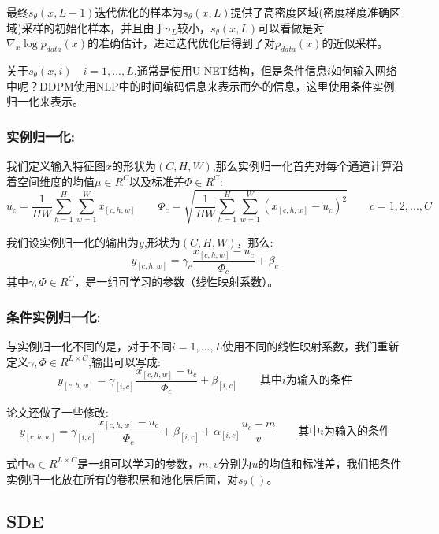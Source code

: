 \documentclass[withoutpreface,bwprint]{cumcmthesis} %
\begin{document}
	最终$s_{\theta}(x,L-1)$迭代优化的样本为$s_{\theta}(x,L)$提供了高密度区域(密度梯度准确区域)采样的初始化样本，并且由于$\sigma_{L}$较小，$s_{\theta}(x,L)$可以看做是对$\nabla_{x} \log p_{data}(x)$的准确估计，进过迭代优化后得到了对$p_{data}(x)$的近似采样。
	
	关于$s_{\theta}(x,i)\quad i=1,...,L$,通常是使用U-NET结构，但是条件信息$i$如何输入网络中呢？DDPM使用NLP中的时间编码信息来表示而外的信息，这里使用条件实例归一化来表示。
	
	\subsubsection{\large{实例归一化:}}
	
	我们定义输入特征图$x$的形状为$(C,H,W)$,那么实例归一化首先对每个通道计算沿着空间维度的均值$\mu \in R^C$以及标准差$\varPhi \in R^C$:
	$$
		u_c=\dfrac{1}{HW}\sum_{h=1}^{H} \sum_{w=1}^{W} x_{\left[c,h,w\right]} \quad \quad  \varPhi_c =\sqrt{ \dfrac{1}{HW}\sum_{h=1}^{H} \sum_{w=1}^{W} \left( x_{\left[c,h,w\right]}-u_c \right)^2}   \quad \quad c=1,2,...,C
	$$
	
	我们设实例归一化的输出为$y$,形状为$(C,H,W)$，那么:
	$$
		y_{\left[ c,h,w \right]} = \gamma_{c} \dfrac{ x_{\left[ c,h,w \right]} - u_c }{\varPhi_c} + \beta_{c}
	$$
	其中$\gamma,\varPhi \in R^C$，是一组可学习的参数（线性映射系数）。
	
		
	\subsubsection{\large{条件实例归一化:}}
	
	与实例归一化不同的是，对于不同$i=1,...,L$使用不同的线性映射系数，我们重新定义$\gamma,\varPhi \in R^{  L \times C  }$,输出可以写成:
	$$
		y_{\left[ c,h,w \right]} = \gamma_{\left[ i,c \right]} \dfrac{ x_{\left[ c,h,w \right]} - u_c }{\varPhi_c} + \beta_{\left[  i,c \right]} \quad\quad \textbf{其中} i\text{为输入的条件}
	$$
	
	论文还做了一些修改:
	$$
		y_{\left[ c,h,w \right]} = \gamma_{\left[ i,c \right]} \dfrac{ x_{\left[ c,h,w \right]} - u_c }{\varPhi_c} + \beta_{\left[  i,c \right]} +\alpha_{\left[i,c\right]}\dfrac{u_c - m}{v} \quad\quad \textbf{其中} i\text{为输入的条件}
	$$
	
	式中$\alpha \in R^{L\times C}$是一组可以学习的参数，$m,v$分别为$u$的均值和标准差，我们把条件实例归一化放在所有的卷积层和池化层后面，对$s_{\theta}()$。
	\subsection{\Large SDE}
	
\end{document}
